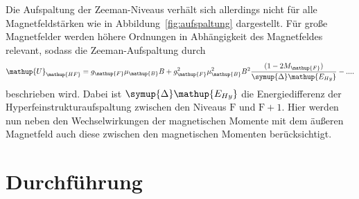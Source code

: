 \documentclass[
  bibliography=totoc,     %
  captions=tableheading,  %
  titlepage=firstiscover, %
]{scrartcl}
\begin{document}
Die Aufspaltung der Zeeman-Niveaus verhält sich allerdings nicht für alle Magnetfeldstärken
wie in Abbildung~\ref{fig:aufspaltung} dargestellt. Für große Magnetfelder werden höhere
Ordnungen in Abhängigkeit des Magnetfeldes relevant, sodass die Zeeman-Aufspaltung durch
%
\begin{equation}
  \mathup{U}_\mathup{HF} = g_{\mathup{F}}\mu_{\mathup{B}}B + g_{\mathup{F}}^2\mu_{\mathup{B}}^2B^2\frac{(1-2M_\mathup{F})}{\symup{\Delta} \mathup{E_{Hy}}} - ....
  \label{eq:quad_zeeman}
\end{equation}
%
beschrieben wird. Dabei ist $\symup{\Delta} \mathup{E_{Hy}}$ die Energiedifferenz der
Hyperfeinstrukturaufspaltung zwischen den Niveaus $\mathup{F}$ und $\mathup{F}+1$.
Hier werden nun neben den Wechselwirkungen der magnetischen Momente mit dem äußeren
Magnetfeld auch diese zwischen den magnetischen Momenten berücksichtigt.

\section{Durchführung}
\label{sec:durchführung}
\end{document}
